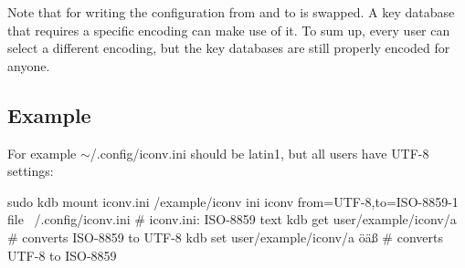 Note that for writing the configuration {\ttfamily from} and {\ttfamily to} is swapped. A key database that requires a specific encoding can make use of it. To sum up, every user can select a different encoding, but the key databases are still properly encoded for anyone.

\subsection*{Example}

For example {\ttfamily $\sim$/.config/iconv.\+ini} should be {\ttfamily latin1}, but all users have {\ttfamily U\+T\+F-\/8} settings\+:


\begin{DoxyCode}
sudo kdb mount iconv.ini /example/iconv ini iconv from=UTF-8,to=ISO-8859-1
file ~/.config/iconv.ini             # iconv.ini: ISO-8859 text
kdb get user/example/iconv/a         # converts ISO-8859 to UTF-8
kdb set user/example/iconv/a öäß     # converts UTF-8 to ISO-8859
\end{DoxyCode}
 
